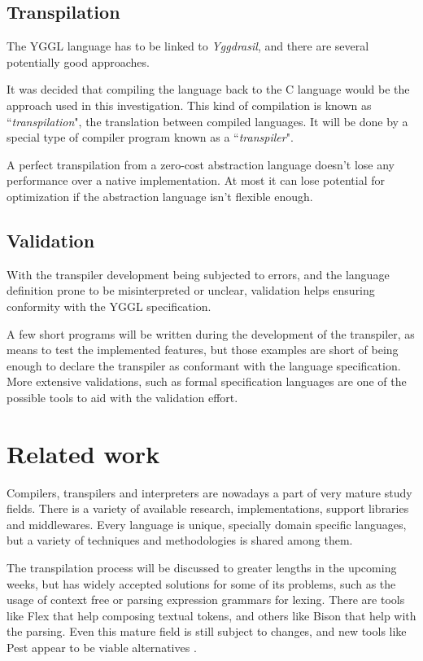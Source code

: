 \documentclass[runningheads]{llncs}
\begin{document}
\subsection{Transpilation}
The YGGL language has to be linked to \textit{Yggdrasil}, and there are several potentially good approaches.
\par It was decided that compiling the language back to the C language would be the approach used in this investigation. This kind of compilation is known as ``\textit{transpilation}", the translation between compiled languages. It will be done by a special type of compiler program known as a ``\textit{transpiler}".
\par A perfect transpilation from a zero-cost abstraction language doesn't lose any performance over a native implementation. At most it can lose potential for optimization if the abstraction language isn't flexible enough.
\subsection{Validation}
With the transpiler development being subjected to errors, and the language definition prone to be misinterpreted or unclear, validation helps ensuring conformity with the YGGL specification.
\par A few short programs will be written during the development of the transpiler, as means to test the implemented features, but those examples are short of being enough to declare the transpiler as conformant with the language specification. More extensive validations, such as formal specification languages are one of the possible tools to aid with the validation effort.

\section{Related work}
Compilers, transpilers and interpreters are nowadays a part of very mature study fields. There is a variety of available research, implementations, support libraries and middlewares. Every language is unique, specially domain specific languages, but a variety of techniques and methodologies is shared among them.
\par The transpilation process will be discussed to greater lengths in the upcoming weeks, but has widely accepted solutions for some of its problems, such as the usage of context free or parsing expression grammars for lexing. There are tools like Flex that help composing textual tokens, and others like Bison that help with the parsing. Even this mature field is still subject to changes, and new tools like Pest appear to be viable alternatives \cite{AppelModernCompiler:1997,FlexBisonLevine:2009,Pest:2019}.
\end{document}
